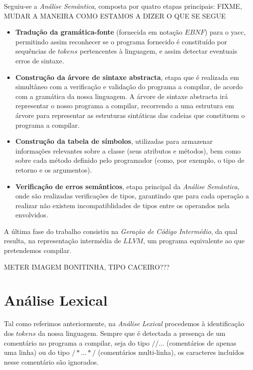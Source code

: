 \documentclass[11pt,a4paper]{article}
\begin{document}
Seguiu-se a \emph{Análise Semântica}, composta por quatro etapas principais: FIXME, MUDAR A MANEIRA COMO ESTAMOS A DIZER O QUE SE SEGUE

\begin{itemize}
\item \textbf{Tradução da gramática-fonte} (fornecida em notação $EBNF$) para o yacc, permitindo assim reconhecer se o programa fornecido é constituído por sequências de $tokens$ pertencentes à linguagem, e assim detectar eventuais erros de sintaxe.

\item \textbf{Construção da árvore de sintaxe abstracta}, etapa que é realizada em simultâneo com a verificação e validação do programa a compilar, de acordo com a gramática da nossa linguagem. A árvore de sintaxe abstracta irá representar o nosso programa a compilar, recorrendo a uma estrutura em árvore para representar as estruturas sintáticas das cadeias que constituem o programa a compilar.

\item \textbf{Construção da tabela de símbolos}, utilizadas para armazenar informações relevantes sobre a classe (seus atributos e métodos), bem como sobre cada método definido pelo programador (como, por exemplo, o tipo de retorno e os argumentos).

\item \textbf{Verificação de erros semânticos}, etapa principal da \emph{Análise Semântica}, onde são realizadas verificações de tipos, garantindo que para cada operação a realizar não existem incompatiblidades de tipos entre os operandos nela envolvidos.
\end{itemize}

A última fase do trabalho consistiu na \emph{Geração de Código Intermédio}, da qual resulta, na representação intermédia de $LLVM$, um programa equivalente ao que pretendemos compilar.

METER IMAGEM BONITINHA, TIPO CACEIRO???

\pagebreak

\section{Análise Lexical}

Tal como referimos anteriormente, na \emph{Análise Lexical} procedemos à identificação dos $tokens$ da nossa linguagem. Sempre que é detectada a presença de um comentário no programa a compilar, seja do tipo $// ...$ (comentários de apenas uma linha) ou do tipo $/* ... */$ (comentários multi-linha), os caracteres incluídos nesse comentário são ignorados.
\end{document}
